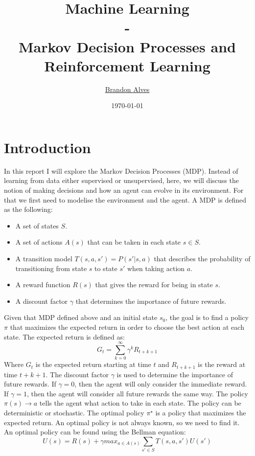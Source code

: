 \documentclass[10pt, twocolumn]{article}
\title{
	Machine Learning
	\\-\\
	Markov Decision Processes and Reinforcement Learning
}
\author{
	\href{mailto:brandon.alves@gatech.edu}{Brandon Alves}
}
\date{\today}
\begin{document}
	\maketitle
	\thispagestyle{empty}
	\tableofcontents
	\section{Introduction}
		In this report I will explore the Markov Decision Processes (MDP). Instead of learning from data either supervised or unsupervised, here, we will discuss the notion of making decisions and how an agent can evolve in its environment. For that we first need to modelise the environment and the agent. A MDP is defined as the following:
		\begin{itemize}
			\item A set of states $S$.
			\item A set of actions $A(s)$ that can be taken in each state $s \in S$.
			\item A transition model $T(s, a, s') = P(s' | s, a)$ that describes the probability of transitioning from state $s$ to state $s'$ when taking action $a$.
			\item A reward function $R(s)$ that gives the reward for being in state $s$.
			\item A discount factor $\gamma$ that determines the importance of future rewards.
		\end{itemize}
		Given that MDP defined above and an initial state $s_0$, the goal is to find a policy $\pi$ that maximizes the expected return in order to choose the best action at each state. The expected return is defined as:
		\begin{equation}
			G_t = \sum_{k=0}^{\infty} \gamma^k R_{t+k+1}
		\end{equation}
		Where $G_t$ is the expected return starting at time $t$ and $R_{t+k+1}$ is the reward at time $t+k+1$. The discount factor $\gamma$ is used to determine the importance of future rewards. If $\gamma = 0$, then the agent will only consider the immediate reward. If $\gamma = 1$, then the agent will consider all future rewards the same way.
		The policy $\pi(s) \rightarrow a$ tells the agent what action to take in each state. The policy can be deterministic or stochastic. The optimal policy $\pi^{\star}$ is a policy that maximizes the expected return. An optimal policy is not always known, so we need to find it. An optimal policy can be found using the Bellman equation:
		\begin{equation}
			U(s) = R(s) + \gamma max_{a \in A(s) }\sum_{s' \in S} T(s, a, s') U(s')
		\end{equation}
\end{document}
